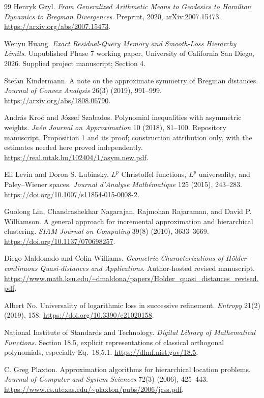 \documentclass[11pt]{article}
\theoremstyle{definition}\newtheorem{definition}[theorem]{Definition}
\theoremstyle{remark}\newtheorem{remark}[theorem]{Remark}
\begin{document}
\begin{thebibliography}{99}
Henryk Gzyl.
\emph{From Generalized Arithmetic Means to Geodesics to Hamilton Dynamics to Bregman Divergences}.
Preprint, 2020, arXiv:2007.15473.
\url{https://arxiv.org/abs/2007.15473}.

Wenyu Huang.
\emph{Exact Residual-Query Memory and Smooth-Loss Hierarchy Limits}.
Unpublished Phase 7 working paper, University of California San Diego, 2026.
Supplied project manuscript; Section 4.

Stefan Kindermann.
A note on the approximate symmetry of Bregman distances.
\emph{Journal of Convex Analysis} 26(3) (2019), 991--999.
\url{https://arxiv.org/abs/1808.06790}.

Andr\'as Kro\'o and J\'ozsef Szabados.
Polynomial inequalities with asymmetric weights.
\emph{Ja\'en Journal on Approximation} 10 (2018), 81--100.
Repository manuscript, Proposition 1 and its proof; construction attribution only, with the estimates needed here proved independently.
\url{https://real.mtak.hu/102404/1/asym.new.pdf}.

Eli Levin and Doron S. Lubinsky.
$L^p$ Christoffel functions, $L^p$ universality, and Paley--Wiener spaces.
\emph{Journal d'Analyse Math\'ematique} 125 (2015), 243--283.
\url{https://doi.org/10.1007/s11854-015-0008-2}.

Guolong Lin, Chandrashekhar Nagarajan, Rajmohan Rajaraman, and David P. Williamson.
A general approach for incremental approximation and hierarchical clustering.
\emph{SIAM Journal on Computing} 39(8) (2010), 3633--3669.
\url{https://doi.org/10.1137/070698257}.

Diego Maldonado and Colin Williams.
\emph{Geometric Characterizations of H\"older-continuous Quasi-distances and Applications}.
Author-hosted revised manuscript.
\url{https://www.math.ksu.edu/~dmaldona/papers/Holder_quasi_distances_revised.pdf}.

Albert No.
Universality of logarithmic loss in successive refinement.
\emph{Entropy} 21(2) (2019), 158.
\url{https://doi.org/10.3390/e21020158}.

National Institute of Standards and Technology.
\emph{Digital Library of Mathematical Functions}.
Section 18.5, explicit representations of classical orthogonal polynomials, especially Eq.~18.5.1.
\url{https://dlmf.nist.gov/18.5}.

C. Greg Plaxton.
Approximation algorithms for hierarchical location problems.
\emph{Journal of Computer and System Sciences} 72(3) (2006), 425--443.
\url{https://www.cs.utexas.edu/~plaxton/pubs/2006/jcss.pdf}.


\end{thebibliography}
\end{document}
